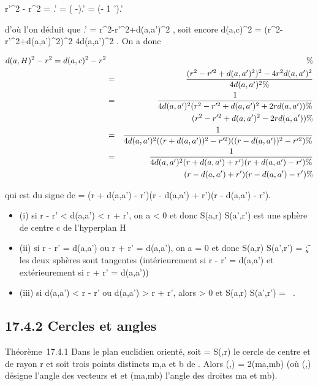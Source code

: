 \documentclass[]{article}
\begin{document}
 r'^2 - r^2  =
\overlinebc.\overlineaa' =
(\overlineac
-\overlineab).\overlineaa' =
(\overlineac - 1 
\overlineaa').\overlineaa'

d'où l'on déduit que
\overlineac.\overlineaa' =
r^2-r'^2+d(a,a')^2  , soit encore d(a,c)^2 =
(r^2-r'^2+d(a,a')^2)^2
\over 4d(a,a')^2 . On a donc

\begin{align*} d(a,H)^2 - r^2
= d(a,c)^2 - r^2&& \%&
\\ & =& (r^2 -
r'^2 + d(a,a')^2)^2 -
4r^2d(a,a')^2 \over
4d(a,a')^2 \%& \\ & =& 1
\over 4d(a,a')^2 (r^2 -
r'^2 + d(a,a')^2 + 2rd(a,a')) \%&
\\ & & \quad
(r^2 - r'^2 + d(a,a')^2 - 2rd(a,a'))
\%& \\ & =& 1 \over
4d(a,a')^2 ((r + d(a,a'))^2 -
r'^2)((r - d(a,a'))^2 - r'^2)\%&
\\ & =& 1 \over
4d(a,a')^2 (r + d(a,a') + r')(r + d(a,a') - r') \%&
\\ & & \quad (r - d(a,a')
+ r')(r - d(a,a') - r') \%& \\
\end{align*}

qui est du signe de \delta = (r + d(a,a') - r')(r - d(a,a') + r')(r - d(a,a')
- r').

\begin{itemize}
\itemsep1pt\parskip0pt
\item
  (i) si r - r' < d(a,a') < r +
  r', on a \delta < 0 et donc S(a,r) \bigcap S(a',r') est une sphère de
  centre c de l'hyperplan H
\item
  (ii) si r - r' = d(a,a') ou r + r' = d(a,a'), on a
  \delta = 0 et donc S(a,r) \bigcap S(a',r') =
  \c\~; les deux sphères sont
  tangentes (intérieurement si r - r' = d(a,a') et
  extérieurement si r + r' = d(a,a'))
\item
  (iii) si d(a,a') < r - r' ou d(a,a')
  > r + r', alors \delta > 0 et S(a,r) \bigcap S(a',r') =
  \varnothing~.
\end{itemize}

\subsection{17.4.2 Cercles et angles}

Théorème~17.4.1 Dans le plan euclidien orienté, soit \Gamma = S(\omega,r) le
cercle de centre \omega et de rayon r et soit trois points distincts m,a et b
de \Gamma. Alors
\widehat(\overrightarrow\omegaa,\overrightarrow\omegab)
= 2\widehat(ma,mb) (où
\widehat(\overrightarrow\omegaa,\overrightarrow\omegab)
désigne l'angle des vecteurs \overrightarrow\omegaa et
\overrightarrow\omegab et
\widehat(ma,mb) l'angle des droites ma et mb).
\end{document}

